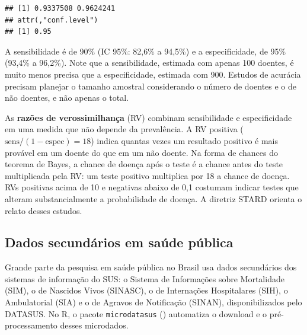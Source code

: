 \documentclass[
]{book}
\newenvironment{Shaded}{\begin{snugshade}}{\end{snugshade}}
\newcommand{\AttributeTok}[1]{\textcolor[rgb]{0.13,0.29,0.53}{#1}}
\newcommand{\CommentTok}[1]{\textcolor[rgb]{0.56,0.35,0.01}{\textit{#1}}}
\newcommand{\ConstantTok}[1]{\textcolor[rgb]{0.56,0.35,0.01}{#1}}
\newcommand{\FunctionTok}[1]{\textcolor[rgb]{0.13,0.29,0.53}{\textbf{#1}}}
\newcommand{\NormalTok}[1]{#1}
\newcommand{\SpecialCharTok}[1]{\textcolor[rgb]{0.81,0.36,0.00}{\textbf{#1}}}
\begin{document}
\begin{Shaded}
\end{Shaded}

\begin{verbatim}
## [1] 0.9337508 0.9624241
## attr(,"conf.level")
## [1] 0.95
\end{verbatim}

A sensibilidade é de 90\% (IC 95\%: 82,6\% a 94,5\%) e a especificidade, de 95\% (93,4\% a 96,2\%). Note que a sensibilidade, estimada com apenas 100 doentes, é muito menos precisa que a especificidade, estimada com 900. Estudos de acurácia precisam planejar o tamanho amostral considerando o número de doentes e o de não doentes, e não apenas o total.

As \textbf{razões de verossimilhança} (RV) combinam sensibilidade e especificidade em uma medida que não depende da prevalência. A RV positiva (\(\text{sens}/(1 - \text{espec}) = 18\)) indica quantas vezes um resultado positivo é mais provável em um doente do que em um não doente. Na forma de chances do teorema de Bayes, a chance de doença após o teste é a chance antes do teste multiplicada pela RV: um teste positivo multiplica por 18 a chance de doença. RVs positivas acima de 10 e negativas abaixo de 0,1 costumam indicar testes que alteram substancialmente a probabilidade de doença. A diretriz STARD orienta o relato desses estudos.

\subsection{Dados secundários em saúde pública}\label{dados-secunduxe1rios-em-sauxfade-puxfablica}

Grande parte da pesquisa em saúde pública no Brasil usa dados secundários dos sistemas de informação do SUS: o Sistema de Informações sobre Mortalidade (SIM), o de Nascidos Vivos (SINASC), o de Internações Hospitalares (SIH), o Ambulatorial (SIA) e o de Agravos de Notificação (SINAN), disponibilizados pelo DATASUS. No R, o pacote \texttt{microdatasus} () automatiza o download e o pré-processamento desses microdados.
\end{document}
